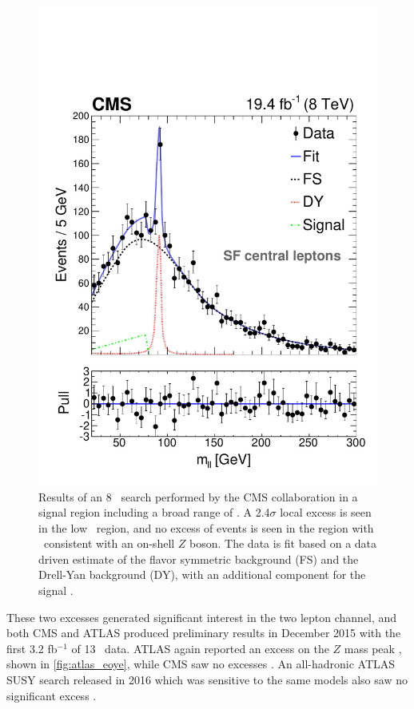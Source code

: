 \begin{centering}
\begin{figure}[!hbt]
\myfloatalign
\includegraphics[width=.9\linewidth]{figures/theory/H1_FIT_SF_CE.pdf}
\caption{ Results of an 8 \tev~search performed by the \ac{CMS} collaboration in a signal region including a broad range of \mll. A 2.4$\sigma$ local excess is seen in the low \mll~region, and no excess of events is seen in the region with \mll~consistent with an on-shell $Z$ boson. The data is fit based on a data driven estimate of the flavor symmetric background (FS) and the Drell-Yan background (DY), with an additional component for the signal \cite{CMS2}.}
\label{fig:cms_8tev}
\end{figure}
\end{centering}

These two excesses generated significant interest in the two lepton channel, and both \ac{CMS} and ATLAS produced preliminary results in December 2015 with the first 3.2 fb$^{-1}$ of 13 \tev~data. ATLAS again reported an excess on the $Z$ mass peak \cite{ATLAS-CONF-2015-082}, shown in \autoref{fig:atlas_eoye}, while \ac{CMS} saw no excesses \cite{CMS-PAS-SUS-15-011}. An all-hadronic ATLAS \ac{SUSY} search released in 2016 which was sensitive to the same models also saw no significant excess \cite{ATLAS:2016kts}.


